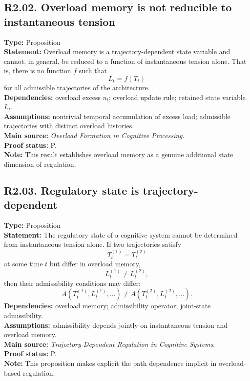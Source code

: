 \documentclass[12pt]{article}
\begin{document}
	\subsection*{R2.02. Overload memory is not reducible to instantaneous tension}
	\textbf{Type:} Proposition \\
	\textbf{Statement:} Overload memory is a trajectory-dependent state variable and cannot, in
	general, be reduced to a function of instantaneous tension alone. That is, there is no
	function $f$ such that
	\[
	L_t = f(T_t)
	\]
	for all admissible trajectories of the architecture. \\
	\textbf{Dependencies:} overload excess $u_t$; overload update rule; retained state variable
	$L_t$. \\
	\textbf{Assumptions:} nontrivial temporal accumulation of excess load; admissible trajectories
	with distinct overload histories. \\
	\textbf{Main source:} \emph{Overload Formation in Cognitive Processing}. \\
	\textbf{Proof status:} P. \\
	\textbf{Note:} This result establishes overload memory as a genuine additional state dimension
	of regulation.
	
	\subsection*{R2.03. Regulatory state is trajectory-dependent}
	\textbf{Type:} Proposition \\
	\textbf{Statement:} The regulatory state of a cognitive system cannot be determined from
	instantaneous tension alone. If two trajectories satisfy
	\[
	T_t^{(1)} = T_t^{(2)}
	\]
	at some time $t$ but differ in overload memory,
	\[
	L_t^{(1)} \neq L_t^{(2)},
	\]
	then their admissibility conditions may differ:
	\[
	A\!\left(T_t^{(1)},L_t^{(1)},\dots\right)
	\neq
	A\!\left(T_t^{(2)},L_t^{(2)},\dots\right).
	\]
	\textbf{Dependencies:} overload memory; admissibility operator; joint-state admissibility. \\
	\textbf{Assumptions:} admissibility depends jointly on instantaneous tension and overload memory. \\
	\textbf{Main source:} \emph{Trajectory-Dependent Regulation in Cognitive Systems}. \\
	\textbf{Proof status:} P. \\
	\textbf{Note:} This proposition makes explicit the path dependence implicit in overload-based
	regulation.
	
\end{document}
